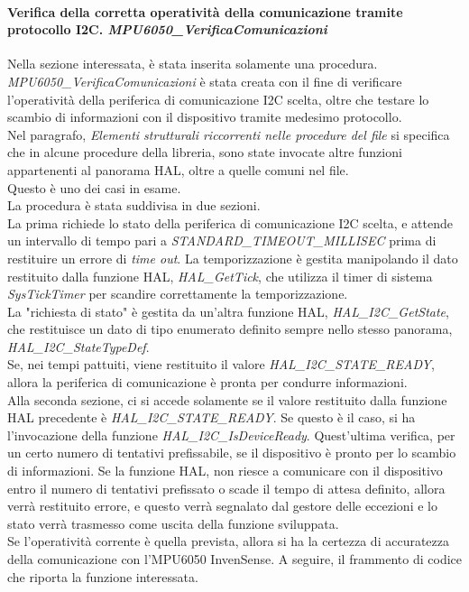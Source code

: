 \documentclass[11pt]{report}
\begin{document}
\paragraph{Verifica della corretta operatività della comunicazione tramite protocollo I2C. \textit{MPU6050\_VerificaComunicazioni}}
Nella sezione interessata, è stata inserita solamente una procedura. \textit{MPU6050\_VerificaComunicazioni} è stata creata con il fine di verificare l'operatività della periferica di comunicazione I2C scelta, oltre che testare lo scambio di informazioni con il dispositivo tramite medesimo protocollo.\\
Nel paragrafo, \textit{Elementi strutturali riccorrenti nelle procedure del file} si specifica che in alcune procedure della libreria, sono state invocate altre funzioni appartenenti al panorama HAL, oltre a quelle comuni nel file.\\
Questo è uno dei casi in esame.\\
La procedura è stata suddivisa in due sezioni.\\
La prima richiede lo stato della periferica di comunicazione I2C scelta, e attende un intervallo di tempo pari a \textit{STANDARD\_TIMEOUT\_MILLISEC} prima di restituire un errore di \textit{time out}. La temporizzazione è gestita manipolando il dato restituito dalla funzione HAL, \textit{HAL\_GetTick}, che utilizza il timer di sistema \textit{SysTickTimer} per scandire correttamente la temporizzazione.\\
La "richiesta di stato" è gestita da un'altra funzione HAL, \textit{HAL\_I2C\_GetState}, che restituisce un dato di tipo enumerato definito sempre nello stesso panorama, \textit{HAL\_I2C\_StateTypeDef}.\\
Se, nei tempi pattuiti, viene restituito il valore \textit{HAL\_I2C\_STATE\_READY}, allora la periferica di comunicazione è pronta per condurre informazioni.\\
Alla seconda sezione, ci si accede solamente se il valore restituito dalla funzione HAL precedente è \textit{HAL\_I2C\_STATE\_READY}. Se questo è il caso, si ha l'invocazione della funzione \textit{HAL\_I2C\_IsDeviceReady}. Quest'ultima verifica, per un certo numero di tentativi prefissabile, se il dispositivo è pronto per lo scambio di informazioni. Se la funzione HAL, non riesce a comunicare con il dispositivo entro il numero di tentativi prefissato o scade il tempo di attesa definito, allora verrà restituito errore, e questo verrà segnalato dal gestore delle eccezioni e lo stato verrà trasmesso come uscita della funzione sviluppata.\\
Se l'operatività corrente è quella prevista, allora si ha la certezza di accuratezza della comunicazione con l'MPU6050 InvenSense.
A seguire, il frammento di codice che riporta la funzione interessata.

\end{document}
